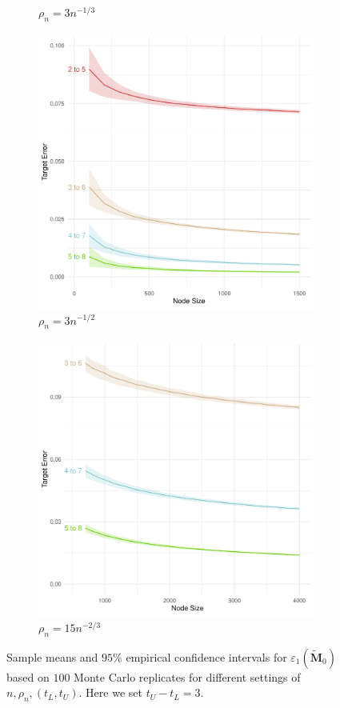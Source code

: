 \documentclass[10pt,journal,compsoc]{IEEEtran}
\numberwithin{equation}{section}
\begin{document}
\begin{figure}
\begin{subfigure}{.23\columnwidth}
\caption{$\rho_n = 3n^{-1/3}$}
\end{subfigure} 
\begin{subfigure}{.23\columnwidth}
\includegraphics[width=\columnwidth]{MM_12_3.pdf}%
\caption{$\rho_n = 3n^{-1/2}$}
\end{subfigure}\hfill
\begin{subfigure}{.23\columnwidth}
\includegraphics[width=\columnwidth]{MM_23_3.pdf}%
\caption{$\rho_n = 15n^{-2/3}$}
\end{subfigure}
\caption{Sample means and $95\%$ empirical confidence
    intervals for $\varepsilon_1(\tilde{\mathbf{M}}_0)$ based on $100$ Monte Carlo replicates for different
    settings of $n,\rho_n, (t_L, t_U)$. Here we set $t_U - t_L = 3$.}
\label{f:rate:2}
\end{figure}
\end{document}
